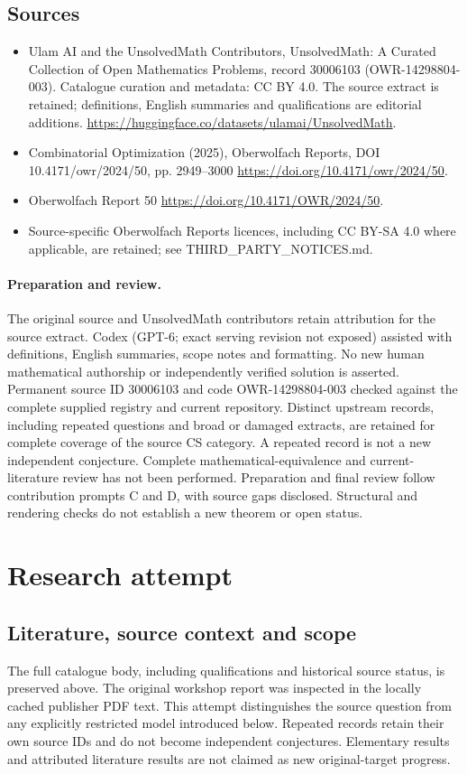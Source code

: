 \documentclass[11pt]{article}
\begin{document}
\subsection{Sources}
\begin{itemize}
\item[S1] Ulam AI and the UnsolvedMath Contributors, UnsolvedMath: A Curated Collection of Open Mathematics Problems, record 30006103 (OWR-14298804-003). Catalogue curation and metadata: CC BY 4.0. The source extract is retained; definitions, English summaries and qualifications are editorial additions.
\url{https://huggingface.co/datasets/ulamai/UnsolvedMath}.
\item[S2] Combinatorial Optimization (2025), Oberwolfach Reports, DOI 10.4171/owr/2024/50, pp. 2949--3000
\url{https://doi.org/10.4171/owr/2024/50}.
\item[S3] Oberwolfach Report 50
\url{https://doi.org/10.4171/OWR/2024/50}.
\item Source-specific Oberwolfach Reports licences, including CC BY-SA 4.0 where applicable, are retained; see THIRD\_PARTY\_NOTICES.md.
\end{itemize}
\paragraph{Preparation and review.}
The original source and UnsolvedMath contributors retain attribution for the source extract. Codex (GPT-6; exact serving revision not exposed) assisted with definitions, English summaries, scope notes and formatting. No new human mathematical authorship or independently verified solution is asserted. Permanent source ID 30006103 and code OWR-14298804-003 checked against the complete supplied registry and current repository. Distinct upstream records, including repeated questions and broad or damaged extracts, are retained for complete coverage of the source CS category. A repeated record is not a new independent conjecture. Complete mathematical-equivalence and current-literature review has not been performed. Preparation and final review follow contribution prompts C and D, with source gaps disclosed. Structural and rendering checks do not establish a new theorem or open status.
\label{end:30006103}

\section{Research attempt}
\subsection{Literature, source context and scope}
The full catalogue body, including qualifications and historical source status, is preserved above. The original workshop report was inspected in the locally cached publisher PDF text. This attempt distinguishes the source question from any explicitly restricted model introduced below. Repeated records retain their own source IDs and do not become independent conjectures. Elementary results and attributed literature results are not claimed as new original-target progress.
\end{document}
